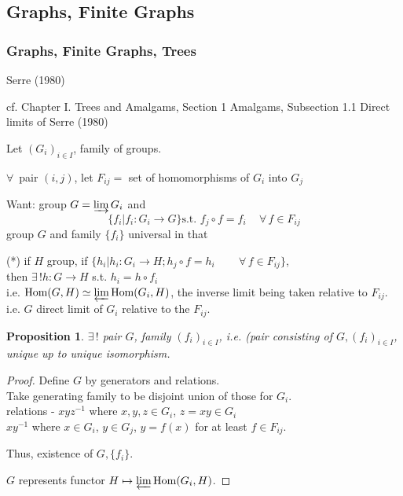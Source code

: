 \documentclass[10pt]{amsart}
\newtheorem{proposition}{Proposition}
\begin{document}
\begin{multicols*}{2}
\part{Graphs, Finite Graphs}

\section{Graphs, Finite Graphs, Trees }

Serre (1980) \cite{Serr1980}  

cf. Chapter I. Trees and Amalgams, Section 1 Amalgams, Subsection 1.1 Direct limits of Serre (1980) \cite{Serr1980}  


Let $(G_i)_{i\in I}$, family of groups.    

$\forall \, $ pair $(i,j)$, let $F_{ij} = $ set of homomorphisms of $G_i$ into $G_j$

Want: group $G= \varinjlim G_i$ and 
\[
\lbrace f_i | f_i : G_i \to G \rbrace \text{s.t. } f_j \circ f = f_i \quad \, \forall \, f \in F_{ij}
\]
group $G$ and family $\lbrace f_i\rbrace$ universal in that  

(*) if $H$ group, if $\lbrace h_i | h_i :G_i \to H ; h_j \circ f = h_i \qquad \, \forall \, f \in F_{ij} \rbrace$, \\
then $\exists \, ! h: G\to H$ s.t. $h_i = h\circ f_i$  \\
i.e. $\text{Hom}(G,H) \simeq \varprojlim \text{Hom}(G_i,H)$, the inverse limit being taken relative to $F_{ij}$.  \\
i.e. $G$ direct limit of $G_i$ relative to the $F_{ij}$.  

\begin{proposition}
	$\exists \, !$ pair $G$, family $(f_i)_{i\in I}$, i.e. (pair consisting of $G, (f_i)_{i\in I}$, unique up to unique isomorphism.  
\end{proposition}
\begin{proof}
Define $G$ by generators and relations.  \\
Take generating family to be disjoint union of those for $G_i$.  \\
relations - $xyz^{-1}$ where $x,y,z \in G_i$, $z=xy \in G_i$ \\
\phantom{relations - } $xy^{-1}$ where $x\in G_i$, $y \in G_j$, $y=f(x)$ for at least $f\in F_{ij}$.  

Thus, existence of $G,\lbrace f_i\rbrace$.  

$G$ represents functor $H\mapsto \varprojlim \text{Hom}{(G_i,H)}$.  


\end{proof}
\end{multicols*}
\end{document}

